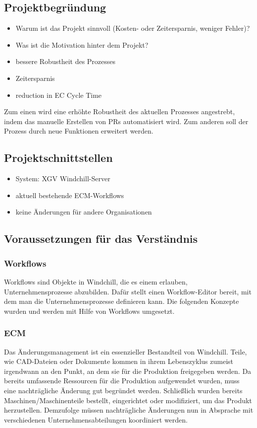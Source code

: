 \subsection{Projektbegründung} 
\label{sec:Projektbegruendung}
\begin{itemize} %
	\item Warum ist das Projekt sinnvoll (\zB Kosten- oder Zeitersparnis, weniger Fehler)?
	\item Was ist die Motivation hinter dem Projekt?
\end{itemize}
\begin{itemize}
	\item bessere Robustheit des Prozesses
	\item Zeitersparnis
	\item reduction in EC Cycle Time
\end{itemize}
Zum einen wird eine erhöhte Robustheit des aktuellen Prozesses angestrebt, indem das manuelle Erstellen von \acp{PR} automatisiert wird.
Zum anderen soll der Prozess durch neue Funktionen erweitert werden.

\subsection{Projektschnittstellen}
\label{sec:Projektschnittstellen}
\begin{itemize}
	\item System: \ac{XGV} Windchill-Server
	\item aktuell bestehende \ac{ECM}-Workflows
	\item keine Änderungen für andere Organisationen
\end{itemize}

\subsection{Voraussetzungen für das Verständnis}
\label{subsec:VerstaendnisVoraussetzungen}

\subsubsection{Workflows}
Workflows sind Objekte in Windchill, die es einem erlauben, Unternehmensprozesse abzubilden.
Dafür stellt einen Workflow-Editor bereit, mit dem man die Unternehmensprozesse definieren kann.
Die folgenden Konzepte wurden und werden mit Hilfe von Workflows umgesetzt.

\subsubsection{\acl{ECM}}
Das Änderungsmanagement ist ein essenzieller Bestandteil von Windchill.
Teile, wie \zB CAD-Dateien oder Dokumente kommen in ihrem Lebenszyklus zumeist irgendwann an den Punkt, an dem sie für die Produktion freigegeben werden.
Da bereits umfassende Ressourcen für die Produktion aufgewendet wurden, muss eine nachträgliche Änderung gut begründet werden.
Schließlich wurden bereits Maschinen/Maschinenteile bestellt, eingerichtet oder modifiziert, um das Produkt herzustellen.
Demzufolge müssen nachträgliche Änderungen nun in Absprache mit verschiedenen Unternehmensabteilungen koordiniert werden.

